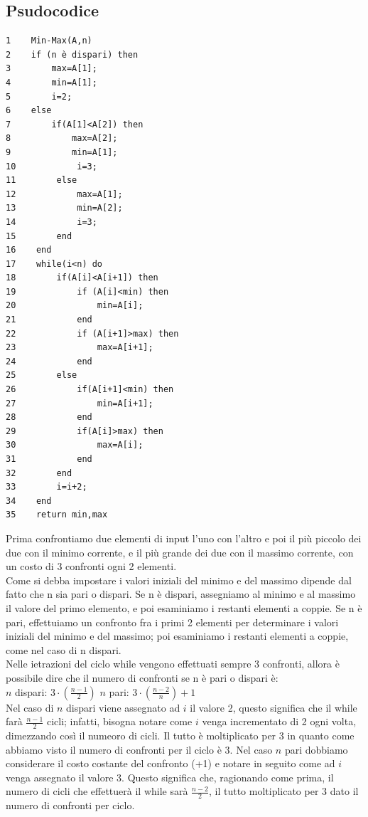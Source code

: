 \subsection{Psudocodice}
\begin{verbatim}
1    Min-Max(A,n)
2    if (n è dispari) then
3        max=A[1];
4        min=A[1];
5        i=2;
6    else
7        if(A[1]<A[2]) then
8            max=A[2];
9            min=A[1];
10            i=3;
11        else
12            max=A[1];
13            min=A[2];
14            i=3;
15        end
16    end
17    while(i<n) do
18        if(A[i]<A[i+1]) then
19            if (A[i]<min) then
20                min=A[i];
21            end
22            if (A[i+1]>max) then
23                max=A[i+1];
24            end
25        else
26            if(A[i+1]<min) then
27                min=A[i+1];
28            end
29            if(A[i]>max) then
30                max=A[i];
31            end
32        end
33        i=i+2;
34    end
35    return min,max      
\end{verbatim}
\noindent Prima confrontiamo due elementi di input l'uno con l'altro e poi il più piccolo dei due con il minimo corrente, e il più grande dei due con il massimo corrente, con un costo di 3 confronti ogni 2 elementi.\\
Come si debba impostare i valori iniziali del minimo e del massimo dipende dal fatto che n sia pari o dispari. Se n è dispari, assegniamo al minimo e al massimo il valore del primo elemento, e poi esaminiamo i restanti elementi a coppie. Se n è pari, effettuiamo un confronto fra i primi 2 elementi per determinare i valori iniziali del minimo e del massimo; poi esaminiamo i restanti elementi a coppie, come nel caso di n dispari.\\
Nelle ietrazioni del ciclo while vengono effettuati sempre 3 confronti, allora è possibile dire che il numero di confronti se n è pari o dispari è:\\
$n$ dispari: $3 \cdot (\frac{n-1}{2})$ \qquad $n$ pari: $3 \cdot (\frac{n-2}{n})+1$\\
Nel caso di $n$ dispari viene assegnato ad $i$ il valore 2, questo significa che il while farà $\frac{n-1}{2}$ cicli; infatti, bisogna notare come $i$ venga incrementato di 2 ogni volta, dimezzando così il numeoro di cicli. 
Il tutto è moltiplicato per 3 in quanto come abbiamo visto il numero di confronti per il ciclo è 3. 
Nel caso $n$ pari dobbiamo considerare il costo costante del confronto (+1) e notare in seguito come ad $i$ venga assegnato il valore 3. 
Questo significa che, ragionando come prima, il numero di cicli che effettuerà il while sarà $\frac{n-2}{2}$, il tutto moltiplicato per 3 dato il numero di confronti per ciclo.\smallskip\\
